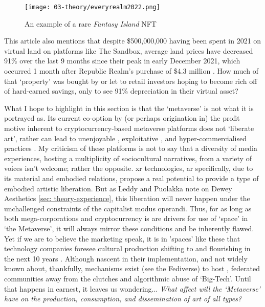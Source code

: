 \begin{wrapfigure}{L}{0.45\textwidth}
    \vspace{-\intextsep}
    \begin{minipage}{0.95\linewidth}
        \texttt{[image: 03-theory/everyrealm2022.png]}
        \captionsetup{justification=justified}
        \caption{An example of a rare \textit{Fantasy Island} NFT \citep[from][]{everyrealm2022}}\label{fig: everyrealm2022}
    \end{minipage}
    \hfill
\end{wrapfigure}

This article also mentions that despite \$500,000,000 having been spent in 2021 on virtual land on platforms like The Sandbox, average land prices have decreased 91\% over the last 9 months since their peak in early December 2021, which occurred 1 month after Republic Realm's purchase of \$4.3 million \citep[]{kane2022}. How much of that `property' was bought by or let to retail investors hoping to become rich off of hard-earned savings, only to see 91\% depreciation in their virtual asset? 

What I hope to highlight in this section is that the `metaverse' is not what it is portrayed as. Its current co-option by (or perhaps origination in) the profit motive inherent to cryptocurrency-based metaverse platforms does not `liberate art', rather can lead to unenjoyable \citep{dejesus2022,delic2022}, exploitative , and hyper-commercialised practices \citep[]{ledesma2021,ongwesojr.2022,gach2022}. My criticism of these platforms is not to say that a diversity of media experiences, hosting a multiplicity of sociocultural narratives, from a variety of voices isn't welcome; rather the opposite. \gls{xr} technologies, \gls{ar} specifically, due to its material and embodied relations, propose a real potential to provide a type of embodied artistic liberation. But as Leddy and Puolakka note on Dewey Aesthetics \autoref{sec: theory-experience}, this liberation will never happen under the unchallenged constraints of the capitalist modus operandi. Thus, for as long as both mega-corporations and cryptocurrency is are drivers for use of `space' in `the Metaverse', it will always mirror these conditions and be inherently flawed. Yet if we are to believe the marketing speak, it is in 'spaces' like these that technology companies foresee cultural production shifting to and flourishing in the next 10 years \citep[]{fatemi2022}. Although nascent in their implementation, and not widely known about, thankfully, mechanisms exist (see the Fediverse) to host , federated communities away from the clutches and algorithmic abuse of `Big-Tech'. Until that happens in earnest, it leaves us wondering... \textit{What affect will the `Metaverse' have on the production, consumption, and dissemination of art of all types?}

